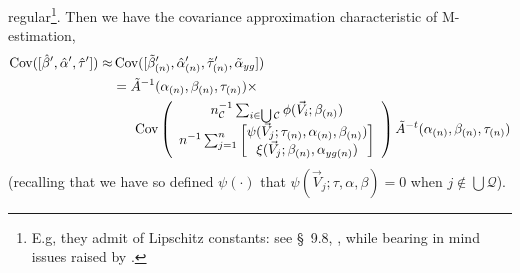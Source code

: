 \documentclass{article}
\begin{document}
regular\footnote{E.g, they admit of Lipschitz constants: see \S~9.8,
  , while bearing in mind issues raised
  by .}.
Then we have the covariance approximation characteristic of M-estimation,
\begin{align*} \operatorname{Cov}([\hat\beta',\hat{\alpha}', \hat\tau']) \approx&
  \operatorname{Cov}([\tilde{\beta}_{(n)}',\hat{\alpha}_{(n)}',\tilde{\tau}_{(n)}', \tilde{\alpha}_{yg}])\\
  &=
    \tilde{A}^{-1}(\alpha_{(n)}, \beta_{(n)}, \tau_{(n)}) \times \\
  &\hspace{1.5em} \operatorname{Cov}\left(
     \begin{array}{c}
       n_{\mathcal{C}}^{-1}\sum_{i\in \bigcup \mathcal{C}}\phi(\vec{V}_{i}; \beta_{(n)} )\\
       n^{-1}\sum_{j=1}^{n}\begin{bmatrix}\psi(\vec{V}_{j}; \tau_{(n)}, \alpha_{(n)}, \beta_{(n)} )\\ \xi(\vec{V}_{j}; \beta_{(n)}, \alpha_{yg(n)}) \end{bmatrix}
     \end{array}
    \right)
  \tilde{A}^{-t}(\alpha_{(n)}, \beta_{(n)}, \tau_{(n)})
\end{align*}
(recalling that we have so defined $\psi(\cdot)$ that $\psi(\vec{V}_{j}; \tau, \alpha, \beta) = 0$ when
$j\not\in \bigcup \mathcal{Q}$).
\end{document}
